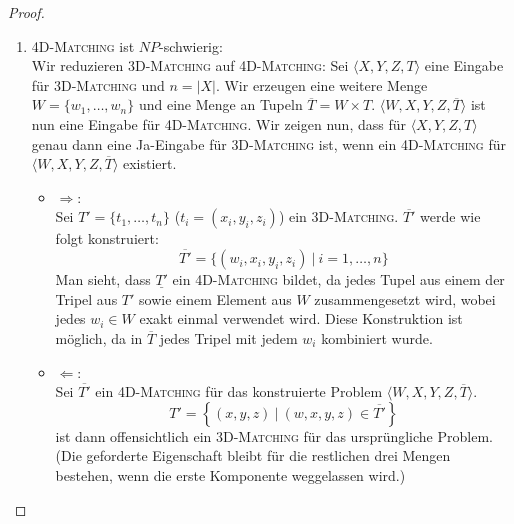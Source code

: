 \documentclass[a4paper]{scrartcl}
\begin{document}
\begin{enumerate}[label=\bfseries \arabic*.]
\begin{enumerate}
\begin{proof}
\begin{enumerate}
            \item \textsc{4D-Matching} ist $NP$-schwierig: \\
                Wir reduzieren \textsc{3D-Matching} auf \textsc{4D-Matching}:
                Sei $\langle X,Y,Z,T \rangle$ eine Eingabe für
                \textsc{3D-Matching} und $n = |X|$.  Wir erzeugen eine weitere
                Menge $W = \{w_1, \dotsc, w_n\}$ und eine Menge an Tupeln
                $\overline{T} = W \times T$.  $\langle W,X,Y,Z,\overline{T}
                \rangle$ ist nun eine Eingabe für \textsc{4D-Matching}. Wir
                zeigen nun, dass für $\langle X,Y,Z,T \rangle$ genau dann eine
                Ja-Eingabe für \textsc{3D-Matching} ist, wenn ein
                \textsc{4D-Matching} für $\langle W,X,Y,Z,\overline{T} \rangle$
                existiert.
                \begin{itemize}
                    \item $\Rightarrow$: \\
                        Sei $T' = \{t_1, \dotsc, t_n\}$ ($t_i = (x_i, y_i,
                        z_i)$) ein \textsc{3D-Matching}.  $\overline{T'}$ werde
                        wie folgt konstruiert:
                        \begin{equation*}
                            \overline{T'} = \{ (w_i, x_i, y_i, z_i)\ |\ i = 1, \dotsc, n \}
                        \end{equation*}
                        Man sieht, dass $\underline{T'}$ ein
                        \textsc{4D-Matching} bildet, da jedes Tupel aus einem
                        der Tripel aus $T'$ sowie einem Element aus $W$
                        zusammengesetzt wird, wobei jedes $w_i \in W$ exakt
                        einmal verwendet wird.  Diese Konstruktion ist möglich,
                        da in $\overline{T}$ jedes Tripel mit jedem $w_i$
                        kombiniert wurde.

                    \item $\Leftarrow$: \\
                        Sei $\overline{T'}$ ein \textsc{4D-Matching} für das
                        konstruierte Problem $\langle W,X,Y,Z,\overline{T}
                        \rangle$.
                        \begin{equation*}
                            T' = \left\{ (x,y,z)\ |\ (w,x,y,z) \in \overline{T'} \right\}
                        \end{equation*}
                        ist dann offensichtlich ein \textsc{3D-Matching} für
                        das ursprüngliche Problem. (Die geforderte Eigenschaft
                        bleibt für die restlichen drei Mengen bestehen, wenn
                        die erste Komponente weggelassen wird.)
                \end{itemize}


\end{enumerate}
\end{proof}
\end{enumerate}
\end{enumerate}
\end{document}
